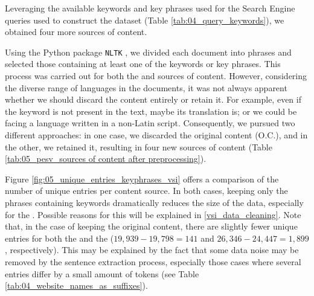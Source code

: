 


\label{vsi_leveraging_keywords}

Leveraging the available keywords and key phrases used for the Search Engine queries used to construct the dataset (Table \ref{tab:04_query_keywords}), we obtained four more sources of content. 


Using the Python package \texttt{NLTK} , we divided each document into phrases and selected those containing at least one of the keywords or key phrases. This process was carried out for both the \trafilaturaAbstract{} and \trafilaturaFulltext{} sources of content. However, considering the diverse range of languages in the documents, it was not always apparent whether we should discard the content entirely or retain it. For example, even if the keyword is not present in the text, maybe its translation is; or we could be facing a language written in a non-Latin script.
Consequently, we pursued two different approaches: in one case, we discarded the original content (O.C.), and in the other, we retained it, resulting in four new sources of content (Table \ref{tab:05_pesv_sources of content after preprocessing}).




Figure \ref{fig:05_unique_entries_keyphrases_vsi} offers a comparison of the number of unique entries per content source. In both cases, keeping only the phrases containing keywords dramatically reduces the size of the data, especially for the \trafilaturaAbstract{}. Possible reasons for this will be explained in \headerName{} \ref{vsi_data_cleaning}. Note that, in the case of keeping the original content, there are slightly fewer unique entries for both the \trafilaturaAbstract{} and the \trafilaturaFulltext{} ($19,939-19,798 = 141$ and $26,346-24,447=1,899$, respectively). This may be explained by the fact that some data noise may be removed by the sentence extraction process, especially those cases where several entries differ by a small amount of tokens (see Table \ref{tab:04_website_names_as_suffixes}).

